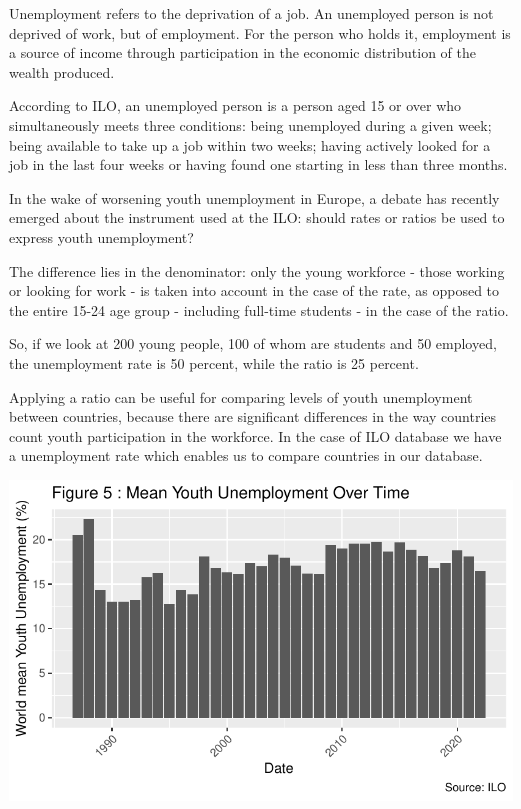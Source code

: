 \documentclass[
  letterpaper,
  DIV=11,
  numbers=noendperiod]{scrartcl}
\begin{document}
Unemployment refers to the deprivation of a job. An unemployed person is
not deprived of work, but of employment. For the person who holds it,
employment is a source of income through participation in the economic
distribution of the wealth produced.

According to ILO, an unemployed person is a person aged 15 or over who
simultaneously meets three conditions: being unemployed during a given
week; being available to take up a job within two weeks; having actively
looked for a job in the last four weeks or having found one starting in
less than three months.

In the wake of worsening youth unemployment in Europe, a debate has
recently emerged about the instrument used at the ILO: should rates or
ratios be used to express youth unemployment?

The difference lies in the denominator: only the young workforce - those
working or looking for work - is taken into account in the case of the
rate, as opposed to the entire 15-24 age group - including full-time
students - in the case of the ratio.

So, if we look at 200 young people, 100 of whom are students and 50
employed, the unemployment rate is 50 percent, while the ratio is 25
percent.

Applying a ratio can be useful for comparing levels of youth
unemployment between countries, because there are significant
differences in the way countries count youth participation in the
workforce. In the case of ILO database we have a unemployment rate which
enables us to compare countries in our database.

\includegraphics{Projet-BM_files/figure-pdf/unnamed-chunk-13-1.pdf}
\end{document}
